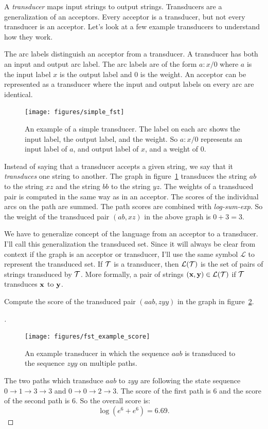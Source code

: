 A \emph{transducer} maps input strings to output strings. Transducers are a
generalization of an acceptors. Every acceptor is a transducer, but not every
transducer is an acceptor. Let's look at a few example transducers to
understand how they work.

The arc labels distinguish an acceptor from a transducer. A transducer has both
an input and output arc label. The arc labels are of the form $a\!:\!x/0$ where
$a$ is the input label $x$ is the output label and $0$ is the weight. An
acceptor can be represented as a transducer where the input and output labels
on every arc are identical.

\begin{figure}
    \centering
    \texttt{[image: figures/simple\_fst]}
    \caption{An example of a simple transducer. The label on each arc shows the
    input label, the output label, and the weight. So $a\!:\!x/0$ represents an
    input label of $a$, and output label of $x$, and a weight of $0$.}
    \label{fig:simple_fst}
\end{figure}

Instead of saying that a transducer accepts a given string, we say that it
\emph{transduces} one string to another. The graph in
figure~\ref{fig:simple_fst} transduces the string $ab$ to the string $xz$ and
the string $bb$ to the string $yz$. The weights of a transduced pair is
computed in the same way as in an acceptor. The scores of the individual arcs
on the path are summed. The path scores are combined with \emph{log-sum-exp}.
So the weight of the transduced pair $(ab, xz)$ in the above graph is $0+3 =
3$.

We have to generalize concept of the language from an acceptor to a transducer.
I'll call this generalization the transduced set. Since it will always be clear
from context if the graph is an acceptor or transducer, I'll use the same
symbol $\mathcal{L}$ to represent the transduced set. If $\mathcal{T}$ is a transducer,
then $\mathcal{L}(\mathcal{T})$ is the set of pairs of strings transduced by $\mathcal{T}$.
More formally, a pair of strings $({\bf x}, {\bf y}) \in \mathcal{L}(\mathcal{T})$ if $\mathcal{T}$
transduces ${\bf x}$ to ${\bf y}$.

\begin{example}
Compute the score of the transduced pair $(aab, zyy)$ in the graph in
figure~\ref{fig:fst_example_score}.
\end{example}

\begin{proof}[\unskip\nopunct]
\begin{figure}
    \centering
    \texttt{[image: figures/fst\_example\_score]}
    \caption{An example transducer in which the sequence $aab$ is transduced to
    the sequence $zyy$ on multiple paths.}
    \label{fig:fst_example_score}
\end{figure}

The two paths which transduce $aab$ to $zyy$ are following the state sequence
$0 \rightarrow 1 \rightarrow 3 \rightarrow 3$ and $0 \rightarrow 0 \rightarrow
2 \rightarrow 3$. The score of the first path is $6$ and the score of the
second path is $6$. So the overall score is:
$$
\log \left(e^6 + e^6\right) = 6.69.
$$
\end{proof}

